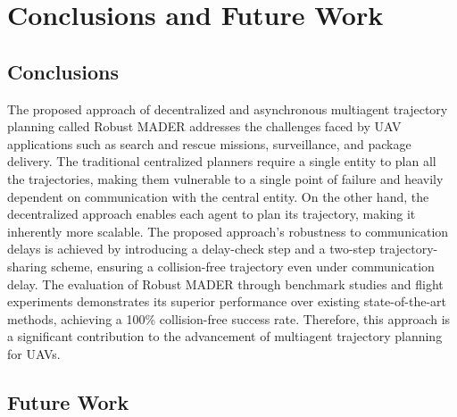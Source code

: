 \chapter{Conclusions and Future Work}\label{chap:conclusions}

\section{Conclusions}

The proposed approach of decentralized and asynchronous multiagent trajectory planning called Robust MADER addresses the challenges faced by UAV applications such as search and rescue missions, surveillance, and package delivery. The traditional centralized planners require a single entity to plan all the trajectories, making them vulnerable to a single point of failure and heavily dependent on communication with the central entity. On the other hand, the decentralized approach enables each agent to plan its trajectory, making it inherently more scalable. The proposed approach's robustness to communication delays is achieved by introducing a delay-check step and a two-step trajectory-sharing scheme, ensuring a collision-free trajectory even under communication delay. The evaluation of Robust MADER through benchmark studies and flight experiments demonstrates its superior performance over existing state-of-the-art methods, achieving a 100\% collision-free success rate. Therefore, this approach is a significant contribution to the advancement of multiagent trajectory planning for UAVs.

\section{Future Work}

